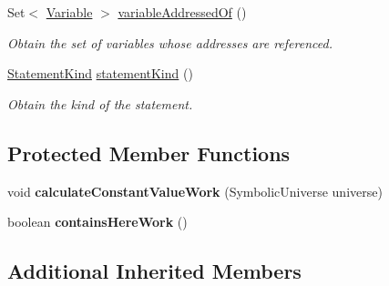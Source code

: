 \begin{DoxyCompactItemize}
Set$<$ \hyperlink{interfaceedu_1_1udel_1_1cis_1_1vsl_1_1civl_1_1model_1_1IF_1_1variable_1_1Variable}{Variable} $>$ \hyperlink{classedu_1_1udel_1_1cis_1_1vsl_1_1civl_1_1model_1_1common_1_1statement_1_1CommonMallocStatement_a254d2223ec9c3540ed74ab5c82735a8a}{variable\+Addressed\+Of} ()
\begin{DoxyCompactList}\small\item\em Obtain the set of variables whose addresses are referenced. \end{DoxyCompactList}\item 
\hyperlink{enumedu_1_1udel_1_1cis_1_1vsl_1_1civl_1_1model_1_1IF_1_1statement_1_1Statement_1_1StatementKind}{Statement\+Kind} \hyperlink{classedu_1_1udel_1_1cis_1_1vsl_1_1civl_1_1model_1_1common_1_1statement_1_1CommonMallocStatement_a31d263178f3be41bdc25b904af1aa625}{statement\+Kind} ()
\begin{DoxyCompactList}\small\item\em Obtain the kind of the statement. \end{DoxyCompactList}\end{DoxyCompactItemize}
\subsection*{Protected Member Functions}
\begin{DoxyCompactItemize}
\item 
\hypertarget{classedu_1_1udel_1_1cis_1_1vsl_1_1civl_1_1model_1_1common_1_1statement_1_1CommonMallocStatement_a7eb7c19ab44285bffc940ac7488c3561}{}void {\bfseries calculate\+Constant\+Value\+Work} (Symbolic\+Universe universe)\label{classedu_1_1udel_1_1cis_1_1vsl_1_1civl_1_1model_1_1common_1_1statement_1_1CommonMallocStatement_a7eb7c19ab44285bffc940ac7488c3561}

\item 
\hypertarget{classedu_1_1udel_1_1cis_1_1vsl_1_1civl_1_1model_1_1common_1_1statement_1_1CommonMallocStatement_abc5ed56f401c3b713534f1386df89f48}{}boolean {\bfseries contains\+Here\+Work} ()\label{classedu_1_1udel_1_1cis_1_1vsl_1_1civl_1_1model_1_1common_1_1statement_1_1CommonMallocStatement_abc5ed56f401c3b713534f1386df89f48}

\end{DoxyCompactItemize}
\subsection*{Additional Inherited Members}


